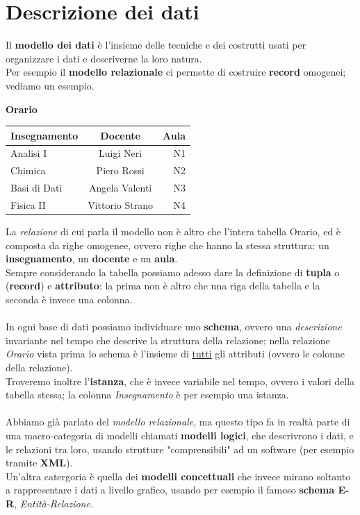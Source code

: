 \section{Descrizione dei dati}
Il \textbf{modello dei dati} è l'insieme delle tecniche e 
dei costrutti usati per organizzare i dati e descriverne la loro natura. \\
Per esempio il \textbf{modello relazionale} ci permette di costruire 
\textbf{record} omogenei; vediamo un esempio.

\begin{center}
  \textbf{Orario} \\ \vspace{4px}
  \begin{tabular}{|l|c|r|}
    \hline
    Insegnamento & Docente & Aula \\ \hline
    Analisi I & Luigi Neri & N1 \\
    Chimica & Piero Rossi & N2 \\ 
    Basi di Dati & Angela Valenti & N3 \\
    Fisica II & Vittorio Strano & N4 \\ \hline
  \end{tabular}
\end{center}

La \emph{relazione} di cui parla il modello non è altro che l'intera 
tabella Orario, ed è composta da righe omogenee, ovvero righe che hanno
la stessa struttura: un \textbf{insegnamento}, un \textbf{docente} 
e un \textbf{aula}. \\
Sempre considerando la tabella possiamo adesso dare la definizione di 
\textbf{tupla} o (\textbf{record}) e \textbf{attributo}: la prima non 
è altro che una riga della tabella e la seconda è invece una colonna.
\\
\\
In ogni base di dati possiamo individuare uno \textbf{schema}, ovvero 
una \textit{descrizione} invariante nel tempo che descrive la struttura della
relazione; nella relazione \textit{Orario} vista prima lo schema è l'insieme
di \underline{tutti} gli attributi (ovvero le colonne della relazione). \\
Troveremo inoltre l'\textbf{istanza}, che è invece variabile nel tempo, ovvero
i valori della tabella stessa; la colonna \textit{Insegnamento} è per esempio una istanza.
\\
\\
Abbiamo già parlato del \textit{modello relazionale}, ma questo tipo fa in
realtà parte di una macro-categoria di modelli chiamati \textbf{modelli logici},
che descrivrono i dati, e le relazioni tra loro, usando strutture "comprensibili" 
ad un software (per esempio tramite \textbf{XML}). \\
Un'altra catergoria è quella dei \textbf{modelli concettuali} che invece mirano 
soltanto a rappresentare i dati a livello grafico, usando per esempio il famoso 
\textbf{schema E-R}, \textit{Entità-Relazione}.
